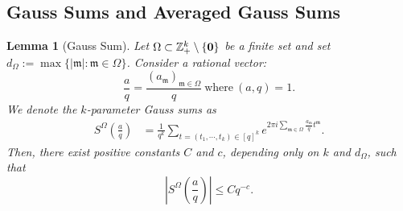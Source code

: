 \documentclass[11 pt,letterpaper]{amsart}
\theoremstyle{plain}
\newtheorem{lemma}{Lemma}\numberwithin{lemma}{section}
\theoremstyle{definition}
\theoremstyle{remark} \theoremstyle{exam} \theoremstyle{ob}
\numberwithin{equation}{section}
\begin{document}
 


\subsection{Gauss Sums and Averaged Gauss Sums}
\begin{lemma}[Gauss Sum] \label{el22} 
Let $\Omega\subset \mathbb{Z}_+^k \setminus \{{\bf 0}\}$ be a finite set and set  $d_{\Omega}:=\max\{|\mathfrak{m}|:\mathfrak{m}\in \Omega\}$. Consider a rational vector: 
   $$
  \frac{a}{q}=\frac{(a_{\mathfrak{m}})_{\mathfrak{m}\in \Omega}}{q}  \ \text{where}  \ (a,q)=1.$$ 
   We denote the $k$-parameter  Gauss sums as 
 \begin{align*} 
 S^{\Omega}\left(\frac{a}{q}\right)& = \frac{1}{q^k}\sum_{t= (t_1,\cdots,t_k)\in [q]^k}e^{2\pi i \sum_{\mathfrak{m}\in\Omega } \frac{a_{\mathfrak{m}}}{q} t^{\mathfrak{m}}}.  
\end{align*}
 Then, there exist positive constants $C$ and $c$, depending only on $k$ and $d_{\Omega}$, such that
\begin{equation}\label{g2}
\left|S^{\Omega}\!\left(\frac{a}{q}\right)\right|
\le C q^{-c}.
\end{equation}
\end{lemma}

 
 
\end{document}
